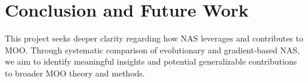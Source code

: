 \documentclass[11pt,a4paper]{article}
\begin{document}
	
	\section{Conclusion and Future Work}
	
	This project seeks deeper clarity regarding how NAS leverages and contributes to MOO. Through systematic comparison of evolutionary and gradient-based NAS, we aim to identify meaningful insights and potential generalizable contributions to broader MOO theory and methods.
	
	
	
	
\end{document}
